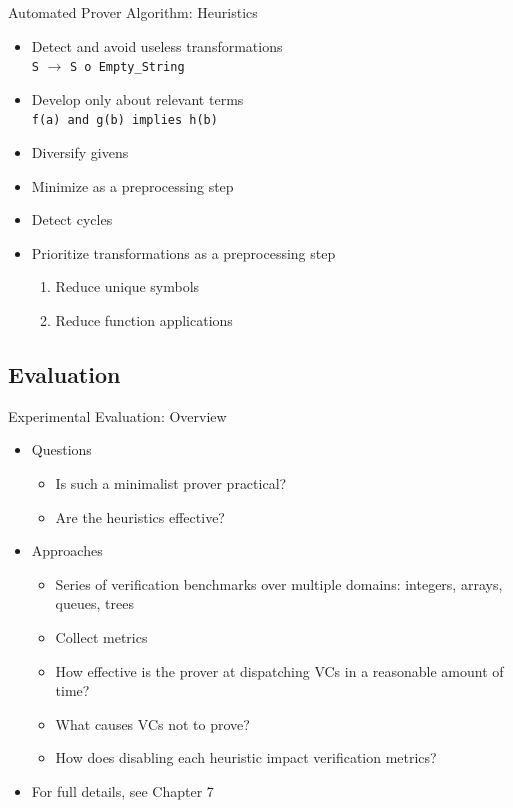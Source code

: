 \begin{frame}{Automated Prover Algorithm: Heuristics}
	\begin{itemize}
		\item Detect and avoid useless transformations\\
			\texttt{S} $\rightarrow$ \texttt{S o Empty\_String}
		\item Develop only about relevant terms\\
			\texttt{f(a) and g(b) implies h(b)}
		\item Diversify givens
		\item Minimize as a preprocessing step
		\item Detect cycles
		\item Prioritize transformations as a preprocessing step\\
			\begin{enumerate}
				\item Reduce unique symbols
				\item Reduce function applications
			\end{enumerate}
	\end{itemize}
\end{frame}


\subsection{Evaluation}
\begin{frame}{Experimental Evaluation: Overview}
	\begin{itemize}
		\item Questions\\
		\begin{itemize}
			\item Is such a minimalist prover practical?
			\item Are the heuristics effective?
		\end{itemize}
		\item Approaches\\
		\begin{itemize}
			\item Series of verification benchmarks over multiple domains: integers, arrays, queues, trees
			\item Collect metrics
			\item How effective is the prover at dispatching VCs in a reasonable amount of time?
			\item What causes VCs not to prove?
			\item How does disabling each heuristic impact verification metrics?
		\end{itemize}
		\item For full details, see Chapter 7
	\end{itemize}
\end{frame}


